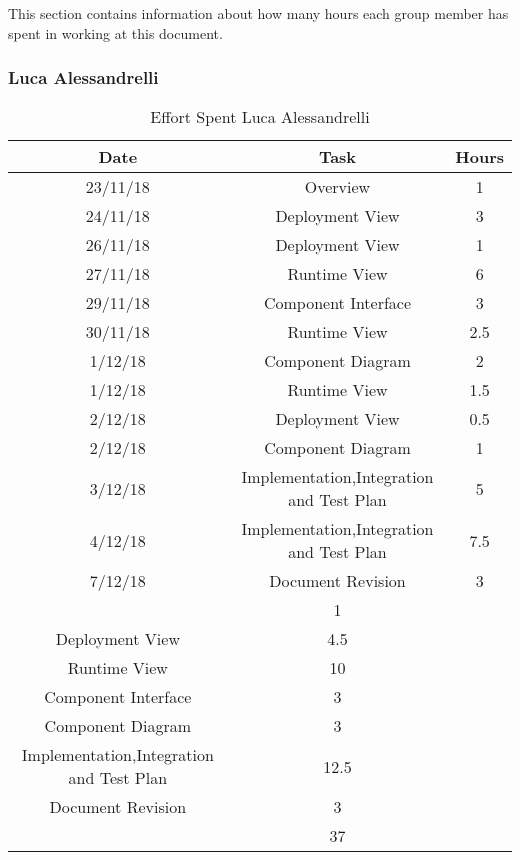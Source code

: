 \noindent
This section contains information about how many hours each group member has spent in working at this document.
\bigbreak

\subsubsection{Luca Alessandrelli}
\begin{table}[h]
\centering
\begin{tabular}{|c|c|c|}
\hline
\rowcolor[HTML]{FE996B} 
Date & Task & Hours 
\\ \hline
\rowcolor[HTML]{FFFC9E} 
23/11/18  & Overview & 1  
\\ \hline
\rowcolor[HTML]{FFFC9E} 
24/11/18 & Deployment View & 3  
\\ \hline
\rowcolor[HTML]{FFFC9E}
26/11/18 & Deployment View & 1 
\\ \hline
\rowcolor[HTML]{FFFC9E}
27/11/18 & Runtime View & 6 
\\ \hline
\rowcolor[HTML]{FFFC9E}
29/11/18 & Component Interface & 3
\\ \hline
\rowcolor[HTML]{FFFC9E}
30/11/18 & Runtime View & 2.5
\\ \hline
\rowcolor[HTML]{FFFC9E}
1/12/18 & Component Diagram & 2 
\\ \hline
\rowcolor[HTML]{FFFC9E}
1/12/18 & Runtime View & 1.5
\\ \hline
\rowcolor[HTML]{FFFC9E}
2/12/18 & Deployment View & 0.5
\\ \hline
\rowcolor[HTML]{FFFC9E}
2/12/18 & Component Diagram & 1 
\\ \hline
\rowcolor[HTML]{FFFC9E}
3/12/18 & Implementation,Integration and Test Plan & 5
\\ \hline
\rowcolor[HTML]{FFFC9E}
4/12/18 & Implementation,Integration and Test Plan & 7.5
\\ \hline
\rowcolor[HTML]{FFFC9E}
7/12/18 & Document Revision & 3
\\ \hline

\rowcolor[HTML]{FFCE93} 
\multicolumn{2}{|c|}{Overview} & 1 \\ 
\hline
\rowcolor[HTML]{FFCE93} 
\multicolumn{2}{|c|} {Deployment View} & 4.5 \\
\hline
\rowcolor[HTML]{FFCE93} 
\multicolumn{2}{|c|} {Runtime View} & 10 \\
\hline
\rowcolor[HTML]{FFCE93} 
\multicolumn{2}{|c|} {Component Interface} & 3 \\
\hline
\rowcolor[HTML]{FFCE93} 
\multicolumn{2}{|c|} {Component Diagram} & 3 \\
\hline
\rowcolor[HTML]{FFCE93} 
\multicolumn{2}{|c|} {Implementation,Integration and Test Plan} & 12.5 \\
\hline
\rowcolor[HTML]{FFCE93} 
\multicolumn{2}{|c|} {Document Revision} & 3 \\
\hline



\rowcolor[HTML]{FE996B} 
\multicolumn{2}{|c|}{\cellcolor[HTML]{FE996B}Total} & \cellcolor[HTML]{FFFC9E}37 \\ \hline
\end{tabular}
\caption{Effort Spent Luca Alessandrelli}
\end{table}

